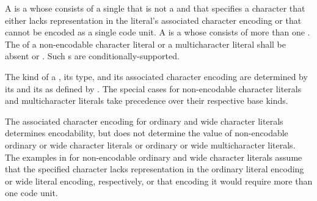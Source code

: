 \pnum
{}%
%
%
%
%
%
%
%
%
%
A 
is a 
whose  consists of a single 
that is not a  and
that specifies a character
that either lacks representation in the literal's associated character encoding
or that cannot be encoded as a single code unit.
A  is a 
whose  consists of
more than one .
The  of
a non-encodable character literal or a multicharacter literal
shall be absent or .
Such s are conditionally-supported.

\pnum
The kind of a ,
its type, and its associated character encoding
are determined by
its  and its 
as defined by .
The special cases for
non-encodable character literals and multicharacter literals
take precedence over their respective base kinds.
\begin{note}
The associated character encoding for ordinary and wide character literals
determines encodability,
but does not determine the value of
non-encodable ordinary or wide character literals or
ordinary or wide multicharacter literals.
The examples in 
for non-encodable ordinary and wide character literals assume that
the specified character lacks representation in
the ordinary literal encoding or wide literal encoding, respectively, or
that encoding it would require more than one code unit.
\end{note}

